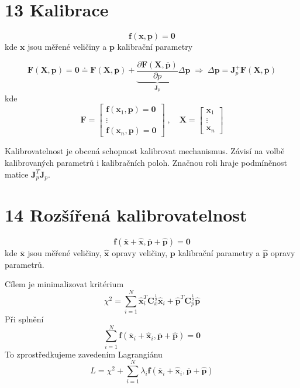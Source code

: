 \documentclass{article}
\begin{document}
	\section{13 Kalibrace}

	\begin{equation}
		\bm{f}(\bm{x},\bm{p}) = \bm{0}
	\end{equation}
	kde $\bm{x}$ jsou měřené veličiny a $\bm{p}$ kalibrační parametry

	\begin{equation}
		\bm{F}(\bm{X},\bm{p})
		=
		\bm{0} \doteq \bm{F}(\bm{X},\bm{\overline{p}})
		+
		\underbrace{\frac{\partial \bm{F}(\bm{X},\bm{\overline{p}})}{\partial p}}_{\bm{J}_p} \Delta\bm{p}
		\;\Rightarrow\;
		\Delta\bm{p} = \bm{J}_p^+ \bm{F}(\bm{X},\bm{\overline{p}})
	\end{equation}
	kde
	\begin{equation}
		\bm{F}
		=
		\begin{bmatrix}
			\bm{f}(\bm{x}_1,\bm{p}) = \bm{0} \\
			\vdots \\
			\bm{f}(\bm{x}_n,\bm{p}) = \bm{0}
		\end{bmatrix}
		\;,\quad 
		\bm{X}
		=
		\begin{bmatrix}
			\bm{x}_1 \\
			\vdots \\
			\bm{x}_n
		\end{bmatrix}
	\end{equation}

	Kalibrovatelnost je obcená schopnost kalibrovat mechanismus. Závisí na volbě kalibrovaných parametrů i kalibračních poloh. Značnou roli hraje podmíněnost matice $\bm{J}_p^T \bm{J}_p$.

	\section*{14 Rozšířená kalibrovatelnost}
	\begin{equation}
		\bm{f}(\bm{\overline{x}}+\bm{\hat{x}},\bm{\overline{p}}+\bm{\hat{p}}) = \bm{0}
	\end{equation}
	kde $\bm{\overline{x}}$ jsou měřené veličiny, $\bm{\hat{x}}$ opravy veličiny, $\bm{p}$ kalibrační parametry a $\bm{\hat{p}}$ opravy parametrů.

	Cílem je minimalizovat kritérium
	\begin{equation}
	\chi^2 = \sum_{i=1}^N \bm{\hat{x}}_i^T \bm{C}_x^{\frac{1}{2}} \bm{\hat{x}}_i + \bm{\hat{p}}^T \bm{C}_p^{\frac{1}{2}} \bm{\hat{p}} 
	\end{equation}
	Při splnění
	\begin{equation}
		\sum_{i=1}^N \bm{f}(\bm{\overline{x}}_i+\bm{\hat{x}}_i,\bm{\overline{p}}+\bm{\hat{p}}) = \bm{0}
	\end{equation}
	To zprostředkujeme zavedením Lagrangiánu
	\begin{equation}
		L = \chi^2 + \sum_{i=1}^N \lambda_i \bm{f}(\bm{\overline{x}}_i+\bm{\hat{x}}_i,\bm{\overline{p}}+\bm{\hat{p}})
	\end{equation}
\end{document}
